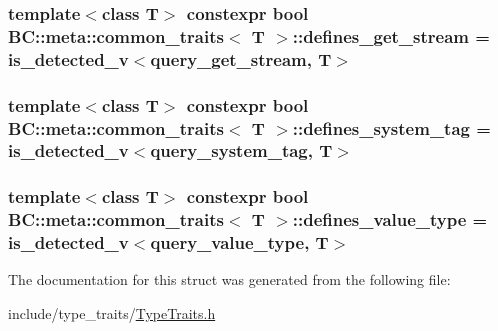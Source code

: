 \subsubsection[{\texorpdfstring{defines\+\_\+get\+\_\+stream}{defines_get_stream}}]{\setlength{\rightskip}{0pt plus 5cm}template$<$class T$>$ constexpr bool {\bf B\+C\+::meta\+::common\+\_\+traits}$<$ T $>$\+::defines\+\_\+get\+\_\+stream = is\+\_\+detected\+\_\+v$<${\bf query\+\_\+get\+\_\+stream}, T$>$\hspace{0.3cm}{\ttfamily [static]}}\hypertarget{structBC_1_1meta_1_1common__traits_a1f6ad19ea07b06a8f2332629eba0587d}{}\label{structBC_1_1meta_1_1common__traits_a1f6ad19ea07b06a8f2332629eba0587d}
\subsubsection[{\texorpdfstring{defines\+\_\+system\+\_\+tag}{defines_system_tag}}]{\setlength{\rightskip}{0pt plus 5cm}template$<$class T$>$ constexpr bool {\bf B\+C\+::meta\+::common\+\_\+traits}$<$ T $>$\+::defines\+\_\+system\+\_\+tag = is\+\_\+detected\+\_\+v$<${\bf query\+\_\+system\+\_\+tag}, T$>$\hspace{0.3cm}{\ttfamily [static]}}\hypertarget{structBC_1_1meta_1_1common__traits_a15dcfd094301c557d563188baa50888d}{}\label{structBC_1_1meta_1_1common__traits_a15dcfd094301c557d563188baa50888d}
\subsubsection[{\texorpdfstring{defines\+\_\+value\+\_\+type}{defines_value_type}}]{\setlength{\rightskip}{0pt plus 5cm}template$<$class T$>$ constexpr bool {\bf B\+C\+::meta\+::common\+\_\+traits}$<$ T $>$\+::defines\+\_\+value\+\_\+type = is\+\_\+detected\+\_\+v$<${\bf query\+\_\+value\+\_\+type}, T$>$\hspace{0.3cm}{\ttfamily [static]}}\hypertarget{structBC_1_1meta_1_1common__traits_a22b2e5a2dcc983c109232f45421f3904}{}\label{structBC_1_1meta_1_1common__traits_a22b2e5a2dcc983c109232f45421f3904}


The documentation for this struct was generated from the following file\+:\begin{DoxyCompactItemize}
\item 
include/type\+\_\+traits/\hyperlink{TypeTraits_8h}{Type\+Traits.\+h}\end{DoxyCompactItemize}
